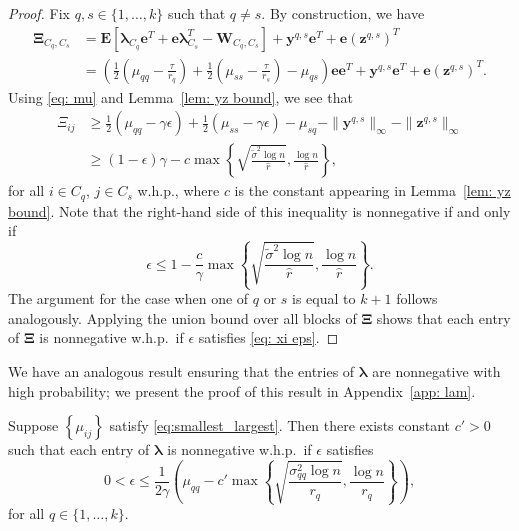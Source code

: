 \documentclass[twoside,11pt]{article}
\newcommand{\E}{\mathbf{E}}
\newcommand{\bs}{\boldsymbol}
\newcommand{\0}{\bs{0}}
\newcommand{\sbra}[1] {\ensuremath{ \left[ #1\right]}} %
\newcommand{\rbra}[1]{\ensuremath{\left( #1 \right)}} %
\newcommand{\bra}[1]{\ensuremath{\left\{ #1 \right\}}} %
\begin{document}
{\begin{proof}
	Fix $q,s \in \{1, \dots, k\}$ such that $q \neq s$.
	By construction, we have
	\begin{align*}
	\bs{\Xi}_{C_q,C_s} %
	&= \E\sbra{\bs{\lambda}_{C_q}\bs{e}^T+\bs{e}\bs{\lambda}_{C_s}^T - \bs{W}_{C_q,C_s}}+ \bs{y}^{q,s}\bs{e}^T+\bs{e}
	\left(\bs{z}^{q,s}\right)^T \\
	&= \left(\frac{1}{2} \left(\mu_{qq} - \frac{\tau}{r_q} \right) + \frac{1}{2} \left(\mu_{ss} - \frac{\tau}{r_s} \right) - \mu_{qs} \right)
	\bs{e}\bs{e}^T + \bs{y}^{q,s}\bs{e}^T+\bs{e}\left(\bs{z}^{q,s}\right)^T.
	\end{align*}
	Using
	\eqref{eq: mu} and
	 Lemma~\ref{lem: yz bound}, we see that
	\begin{align*}
	\Xi_{ij} &\geq \frac{1}{2} \left(\mu_{qq} - \gamma \epsilon \right) + \frac{1}{2} \left(\mu_{ss} - \gamma \epsilon \right) - \mu_{sq} -
	\|\bs{y}^{q,s}\|_{\infty}-\|\bs{z}^{q,s}\|_{\infty} \\
	& \ge (1 - \epsilon)\gamma - c \max \bra{ \sqrt{ \frac{\tilde \sigma^2 \log n}{\hat r}} ,
			\frac{\log n}{\hat r} },
	\end{align*}
	for all $i \in C_q$, $j\in C_s$ w.h.p., where $c$ is the constant appearing in
	Lemma~\ref{lem: yz bound}. Note that
	the right-hand side of this inequality is nonnegative	if and only if
	\[\epsilon \leq 1 - \frac{c}{\gamma}\max \bra{ \sqrt{ \frac{\tilde \sigma^2 \log n}{\hat r}} ,
			\frac{\log n}{\hat r} } . \]
	The argument for the case when one of $q$ or $s$ is equal to $k+1$
	follows analogously.
	Applying the union bound over all blocks of \(\bs \Xi\) shows that each entry
	of $\bs{\Xi}$ is nonnegative
	w.h.p.~if $\epsilon$ satisfies \eqref{eq: xi eps}.
\end{proof}
\medskip

We have an analogous result ensuring that the entries of \(\bs\lambda\) are nonnegative
with high probability; we present the proof of this result in Appendix~\ref{app: lam}.

\begin{proposition} \label{prop: lam}
	Suppose $\bra{\mu_{ij}}$ satisfy \eqref{eq:smallest_largest}. Then there
	exists constant $c' > 0$ such that each entry of $\bs{\lambda}$ is nonnegative w.h.p.~if $\epsilon$ satisfies
	\begin{equation} \label{eq: lam eps}
	0 < \epsilon \leq  \frac{1}{2\gamma}
	\rbra{ \mu_{qq}  - c' \max \bra{ \sqrt{  \frac{\sigma_{qq}^2 \log 		n }{r_q} },
			\frac{\log n }{r_q} } },
	\end{equation}
	for all $ q \in \{1,\dots, k\}$.
\end{proposition}

}
\end{document}
